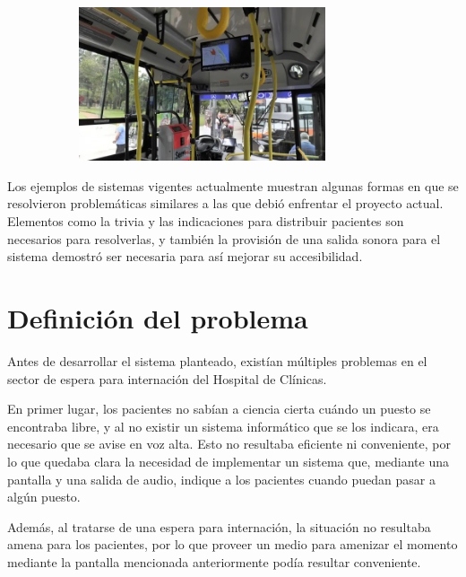 \documentclass[twoside]{article}
\begin{document}
\begin{figure}[H]
	\caption{Colectivo con pantalla que muestra información relevante}
    \begin{subfigure}{1.0\textwidth}
	\includegraphics[width=0.8\textwidth]{colectivo.png}
    \end{subfigure}
	\label{fig:colectivo}
\end{figure}
\vspace{-1.0\baselineskip}
Los ejemplos de sistemas vigentes actualmente muestran algunas formas en que se resolvieron problemáticas similares a las que debió enfrentar el proyecto actual. Elementos como la trivia y las indicaciones para distribuir pacientes son necesarios para resolverlas, y también la provisión de una salida sonora para el sistema demostró ser necesaria para así mejorar su accesibilidad.
\newpage
\section{Definición del problema}
Antes de desarrollar el sistema planteado, existían múltiples problemas en el sector de espera para internación del Hospital de Clínicas.

En primer lugar, los pacientes no sabían a ciencia cierta cuándo un puesto se encontraba libre, y al no existir un sistema informático que se los indicara, era necesario que se avise en voz alta. Esto no resultaba eficiente ni conveniente, por lo que quedaba clara la necesidad de implementar un sistema que, mediante una pantalla y una salida de audio, indique a los pacientes cuando puedan pasar a algún puesto.

Además, al tratarse de una espera para internación, la situación no resultaba amena para los pacientes, por lo que proveer un medio para amenizar el momento mediante la pantalla mencionada anteriormente podía resultar conveniente.
\end{document}

